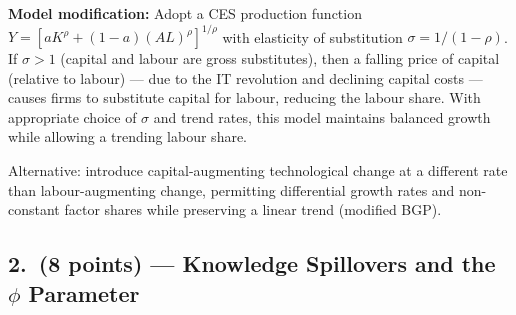 \documentclass[a4paper,11pt]{article}
\begin{document}
\begin{answerbox}
\textbf{Model modification:} Adopt a CES production function $Y = [aK^\rho + (1-a)(AL)^\rho]^{1/\rho}$ with elasticity of substitution $\sigma = 1/(1-\rho)$. If $\sigma > 1$ (capital and labour are gross substitutes), then a falling price of capital (relative to labour) — due to the IT revolution and declining capital costs — causes firms to substitute capital for labour, reducing the labour share.  With appropriate choice of $\sigma$ and trend rates, this model maintains balanced growth while allowing a trending labour share.

Alternative: introduce capital-augmenting technological change at a different rate than labour-augmenting change, permitting differential growth rates and non-constant factor shares while preserving a linear trend (modified BGP).
\end{answerbox}

\subsection*{2.\ (8 points) --- Knowledge Spillovers and the $\phi$ Parameter}
\end{document}
